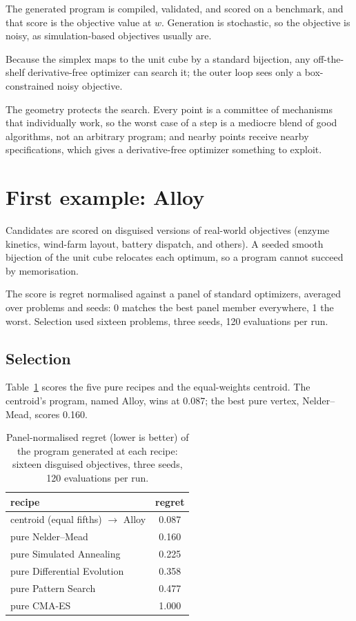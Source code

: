 \documentclass[11pt]{article}
\begin{document}
The generated program is compiled, validated, and scored on a benchmark,
and that score is the objective value at $w$. Generation is stochastic, so
the objective is noisy, as simulation-based objectives usually are.

Because the simplex maps to the unit cube by a standard bijection, any
off-the-shelf derivative-free optimizer can search it; the outer loop sees
only a box-constrained noisy objective.

The geometry protects the search. Every point is a committee of mechanisms
that individually work, so the worst case of a step is a mediocre blend of
good algorithms, not an arbitrary program; and nearby points receive nearby
specifications, which gives a derivative-free optimizer something to
exploit.

\section{First example: Alloy}

Candidates are scored on disguised versions of real-world objectives
(enzyme kinetics, wind-farm layout, battery dispatch, and others). A seeded
smooth bijection of the unit cube relocates each optimum, so a program
cannot succeed by memorisation.

The score is regret normalised against a panel of standard optimizers,
averaged over problems and seeds: 0 matches the best panel member
everywhere, 1 the worst. Selection used sixteen problems, three seeds, 120
evaluations per run.

\subsection{Selection}

Table~\ref{tab:warm} scores the five pure recipes and the equal-weights
centroid. The centroid's program, named Alloy, wins at 0.087; the best pure
vertex, Nelder--Mead, scores 0.160.

\begin{table}[h]
\centering
\begin{tabular}{lc}
\toprule
recipe & regret \\
\midrule
centroid (equal fifths) $\rightarrow$ Alloy & 0.087 \\
pure Nelder--Mead & 0.160 \\
pure Simulated Annealing & 0.225 \\
pure Differential Evolution & 0.358 \\
pure Pattern Search & 0.477 \\
pure CMA-ES & 1.000 \\
\bottomrule
\end{tabular}
\caption{Panel-normalised regret (lower is better) of the program generated
at each recipe: sixteen disguised objectives, three seeds, 120 evaluations
per run.}
\label{tab:warm}
\end{table}
\end{document}
